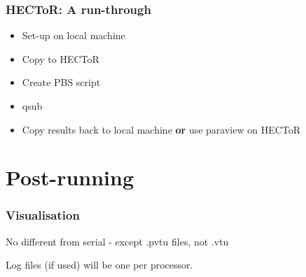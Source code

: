 \documentclass[12pt]{beamer}
\begin{document}
\begin{frame}
    \frametitle{HECToR: A run-through}
\begin{itemize}
\item Set-up on local machine
\item Copy to HECToR
\item Create PBS script
\item qsub
\item Copy results back to local machine \textbf{or} use paraview on HECToR
\end{itemize}
\end{frame}


\section{Post-running}
\begin{frame}
    \frametitle{Visualisation}
No different from serial - except .pvtu files, not .vtu
\vspace{5mm}

Log files (if used) will be one per processor.
\end{frame}
\end{document}
